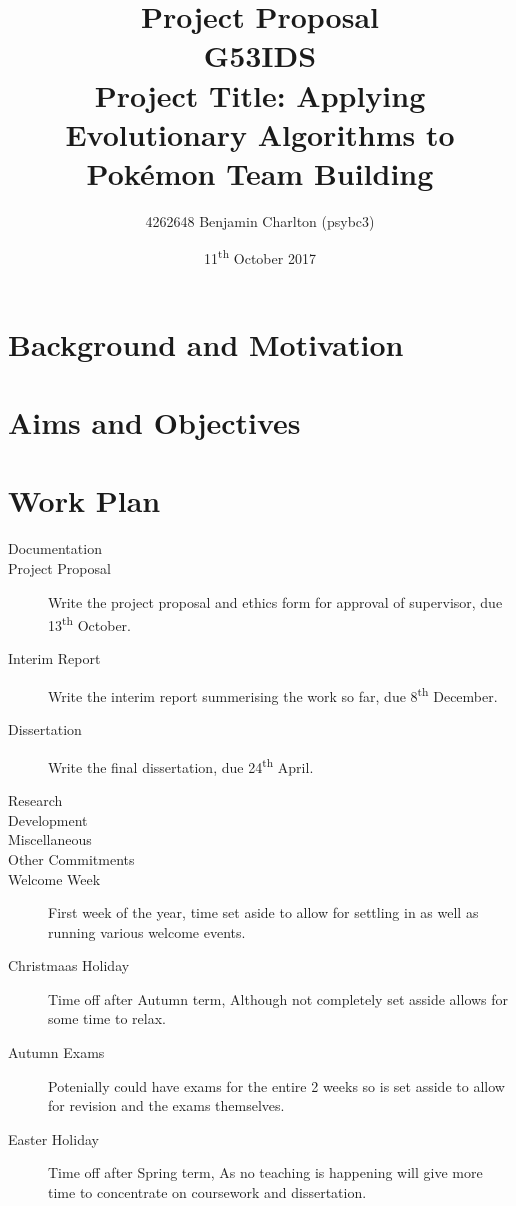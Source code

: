 \documentclass{article}
\newcommand{\Pokemon}{Pok\'{e}mon}
\begin{document}
\title{
    Project Proposal
    \\ \large{G53IDS}
    \\ \large{Project Title: Applying Evolutionary Algorithms to \Pokemon{} Team Building}\vspace{-3ex}}
\author{4262648 Benjamin Charlton (psybc3)}
\date{\vspace{-2ex}11\textsuperscript{th} October 2017}
\maketitle

\section{Background and Motivation}
\lipsum[1]

\section{Aims and Objectives}
\lipsum[1]

\section{Work Plan}
\lipsum[1]

\begin{description}
\item [Documentation]
\item [Project Proposal] Write the project proposal and ethics form for approval of supervisor, due 13\textsuperscript{th} October.
\item [Interim Report] Write the interim report summerising the work so far, due 8\textsuperscript{th} December.
\item [Dissertation] Write the final dissertation, due 24\textsuperscript{th} April.

\item [Research]

\item [Development]

\item [Miscellaneous]

\item [Other Commitments]
\item [Welcome Week] First week of the year, time set aside to allow for settling in as well as running various welcome events.
\item [Christmaas Holiday] Time off after Autumn term, Although not completely set asside allows for some time to relax.
\item [Autumn Exams] Potenially could have exams for the entire 2 weeks so is set asside to allow for revision and the exams themselves.
\item [Easter Holiday] Time off after Spring term, As no teaching is happening will give more time to concentrate on coursework and dissertation.
\end{description}

\nocite{bar}


\end{document}
